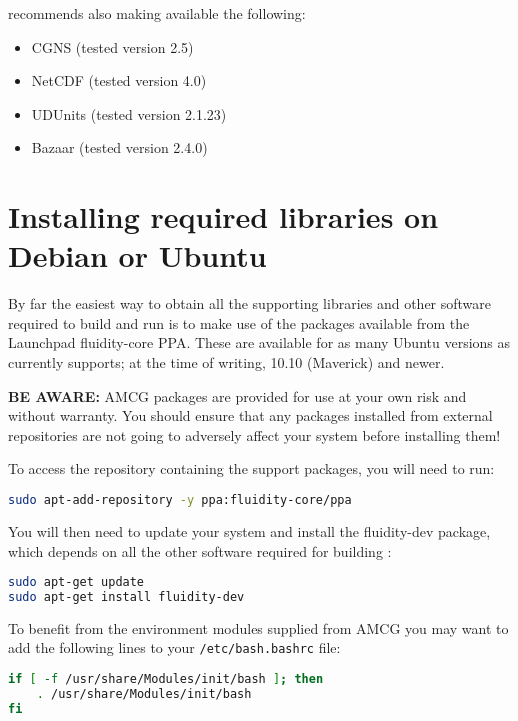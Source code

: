 \fluidity recommends also making available the following:

\begin{itemize}
\item CGNS (tested version 2.5)
\item NetCDF (tested version 4.0)
\item UDUnits (tested version 2.1.23)
\item Bazaar (tested version 2.4.0)
\end{itemize}

\section{Installing required libraries on Debian or Ubuntu}
\label{sec:required_ḻibraries_debian}

By far the easiest way to obtain all the supporting libraries and other
software required to build and run \fluidity is to make use of the \fluidity
packages available from the Launchpad fluidity-core PPA. These are available
for as many Ubuntu versions as \fluidity currently supports; at the time of
writing, 10.10 (Maverick) and newer.

\textbf{BE AWARE:} AMCG packages are provided for use at your own risk and
without warranty. You should ensure that any packages installed from external
repositories are not going to adversely affect your system before installing
them!

To access the repository containing the \fluidity support packages, you will
need to run:

\begin{lstlisting}[language=bash]
sudo apt-add-repository -y ppa:fluidity-core/ppa
\end{lstlisting}

You will then need to update your system and install the fluidity-dev package,
which depends on all the other software required for building \fluidity:

\begin{lstlisting}[language=bash]
sudo apt-get update
sudo apt-get install fluidity-dev
\end{lstlisting}

To benefit from the environment modules supplied from AMCG you may want to add
the following lines to your \lstinline[language=bash]+/etc/bash.bashrc+ file:

\begin{lstlisting}[language=bash]
if [ -f /usr/share/Modules/init/bash ]; then
    . /usr/share/Modules/init/bash
fi
\end{lstlisting}

